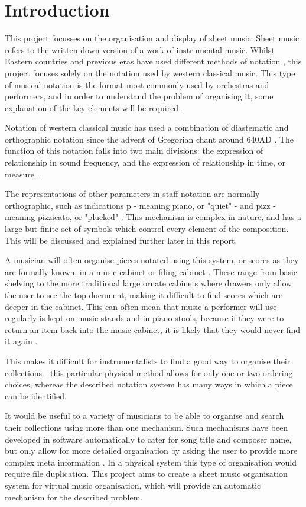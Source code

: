 \section{Introduction}
This project focusses on the organisation and display of sheet music. Sheet music refers to the written down version of a work of instrumental music. Whilst Eastern countries and previous eras have used different methods of notation \parencite{Kaufman}, this project focuses solely on the notation used by western classical music. This type of musical notation is the format most commonly used by orchestras and performers, and in order to understand the problem of organising it, some explanation of the key elements will be required.

Notation of western classical music has used a combination of diastematic and orthographic notation \parencite{RRastall} since the advent of Gregorian chant around 640AD \parencite{RTaruskin}. The function of this notation falls into two main divisions: the expression of relationship in sound frequency, and the expression of relationship in time, or measure \parencite{oxHistory}.

The representations of other parameters in staff notation are normally orthographic, such as indications p - meaning piano, or "quiet" - and pizz - meaning pizzicato, or "plucked" \parencite{RRastall}. This mechanism is complex in nature, and has a large but finite set of symbols which control every element of the composition. This will be discussed and explained further later in this report.

A musician will often organise pieces notated using this system, or scores as they are formally known, in a music cabinet or filing cabinet \parencite{musicOrganising}. These range from basic shelving to the more traditional large ornate cabinets where drawers only allow the user to see the top document, making it difficult to find scores which are deeper in the cabinet. This can often mean that music a performer will use regularly is kept on music stands and in piano stools, because if they were to return an item back into the music cabinet, it is likely that they would never find it again \parencite{SheetMusicRant}.

This makes it difficult for instrumentalists to find a good way to organise their collections - this particular physical method allows for only one or two ordering choices, whereas the described notation system has many ways in which a piece can be identified. 

It would be useful to a variety of musicians to be able to organise and search their collections using more than one mechanism. Such mechanisms have been developed in software automatically to cater for song title and composer name, but only allow for more detailed organisation by asking the user to provide more complex meta information \parencite{calypso}. In a physical system this type of organisation would require file duplication. This project aims to create a sheet music organisation system for virtual music organisation, which will provide an automatic mechanism for the described problem.

